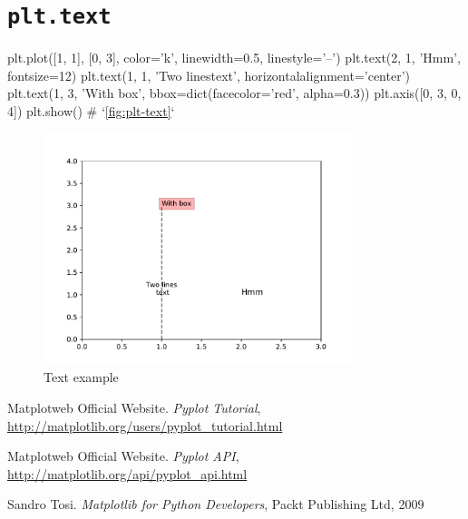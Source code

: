 \documentclass{report}
\begin{document}
\section{\texttt{plt.text}}
\begin{py}
plt.plot([1, 1], [0, 3], color='k', linewidth=0.5, linestyle='--')
plt.text(2, 1, 'Hmm', fontsize=12)
plt.text(1, 1, 'Two lines\n text', horizontalalignment='center')
plt.text(1, 3, 'With box', bbox=dict(facecolor='red', alpha=0.3))
plt.axis([0, 3, 0, 4])
plt.show()  # `\autoref{fig:plt-text}`
\end{py}

\begin{figure}[!htb]
  \centering
  \includegraphics[width=90mm]{plt-text}
  \caption{Text example}
  \label{fig:plt-text}
\end{figure}

%
%

\appendix

\begin{thebibliography}{9}
 Matplotweb Official Website. 
  \newblock \emph{Pyplot Tutorial}, \\ \url{http://matplotlib.org/users/pyplot_tutorial.html}

 Matplotweb Official Website. 
  \newblock \emph{Pyplot API}, \\  
  \url{http://matplotlib.org/api/pyplot_api.html}
  
 Sandro Tosi.
  \newblock \emph{Matplotlib for Python Developers},
  \newblock Packt Publishing Ltd, 2009
\end{thebibliography}
\end{document}
